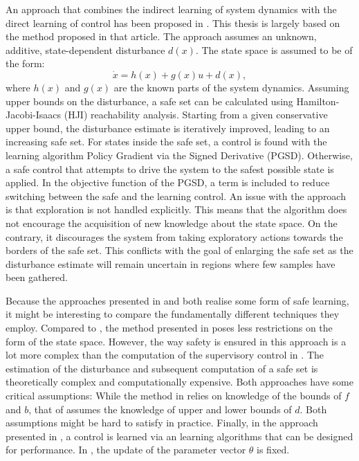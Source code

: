 \documentclass[../main.tex]{subfiles}
\begin{document}
An approach that combines the indirect learning of system dynamics with the direct learning of control has been proposed in \cite{akametalu2014reachability}. This thesis is largely based on the method proposed in that article. The approach assumes an unknown, additive, state-dependent disturbance $d(x)$. The state space is assumed to be of the form:
\begin{equation}
    \dot{x} = h(x)+g(x)u+d(x),
\end{equation}
where $h(x)$ and $g(x)$ are the known parts of the system dynamics.
Assuming upper bounds on the disturbance, a safe set can be calculated using Hamilton-Jacobi-Isaacs (HJI) reachability analysis. Starting from a given conservative upper bound, the disturbance estimate is iteratively improved, leading to an increasing safe set. For states inside the safe set, a control is found with the learning algorithm Policy Gradient via the Signed Derivative (PGSD). Otherwise, a safe control that attempts to drive the system to the safest possible state is applied. In the objective function of the PGSD, a term is included to reduce switching between the safe and the learning control. An issue with the approach is that exploration is not handled explicitly. This means that the algorithm does not encourage the acquisition of new knowledge about the state space. On the contrary, it discourages the system from taking exploratory actions towards the borders of the safe set. This conflicts with the goal of enlarging the safe set as the disturbance estimate will remain uncertain in regions where few samples have been gathered. \par

Because the approaches presented in \cite{akametalu2014reachability} and \cite{wang1993stable} both realise some form of safe learning, it might be interesting to compare the fundamentally different techniques they employ.  Compared to \cite{wang1993stable}, the method presented in \cite{akametalu2014reachability} poses less restrictions on the form of the state space. However, the way safety is ensured in this approach is a lot more complex than the computation of the supervisory control in \cite{wang1993stable}. The estimation of the disturbance and subsequent computation of a safe set is theoretically complex and computationally expensive. Both approaches have some critical assumptions: While the method in \cite{wang1993stable} relies on knowledge of the bounds of $f$ and $b$, that of \cite{akametalu2014reachability} assumes the knowledge of upper and lower bounds of $d$. Both assumptions might be hard to satisfy in practice. Finally, in the approach presented in \cite{akametalu2014reachability}, a control is learned via an learning algorithms that can be designed for performance. In \cite{wang1993stable}, the update of the parameter vector $\theta$ is fixed.
\end{document}
